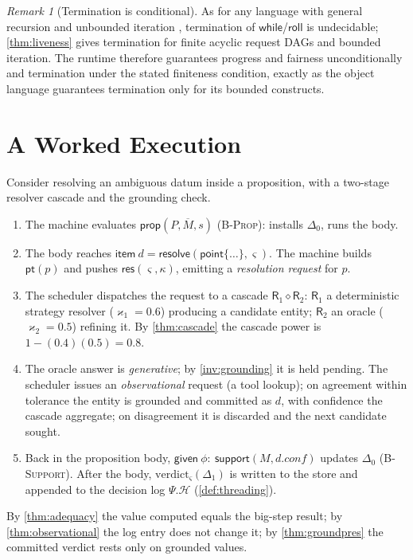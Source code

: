 \documentclass[11pt,a4paper]{article}
\theoremstyle{plain}
\theoremstyle{definition}
\theoremstyle{remark}
\newtheorem{remark}[theorem]{Remark}
\newcommand{\cont}{\kappa}
\newcommand{\dbt}{\Delta}
\newcommand{\sys}{\Psi}
\newcommand{\catp}{\varkappa}              %
\newcommand{\Res}{\mathsf{R}}              %
\newcommand{\rn}[1]{\textsc{#1}}
\begin{document}
\begin{remark}[Termination is conditional]
As for any language with general recursion and unbounded iteration
\citep{hopcroft2006}, termination of $\mathsf{while}$/$\mathsf{roll}$ is
undecidable; \cref{thm:liveness} gives termination for finite acyclic request
DAGs and bounded iteration. The runtime therefore guarantees progress and
fairness unconditionally and termination under the stated finiteness condition,
exactly as the object language guarantees termination only for its bounded
constructs.
\end{remark}

\section{A Worked Execution}
\label{sec:trace}

Consider resolving an ambiguous datum inside a proposition, with a two-stage
resolver cascade and the grounding check.

\begin{enumerate}[leftmargin=1.5em]
\item The machine evaluates $\mathsf{prop}(P,\overline M,s)$ (\rn{B-Prop}):
installs $\dbt_0$, runs the body.
\item The body reaches $\mathsf{item}\ d=\mathsf{resolve}(\mathsf{point}\{
\dots\},\varsigma)$. The machine builds $\mathsf{pt}(p)$ and pushes
$\mathsf{res}(\varsigma,\cont)$, emitting a \emph{resolution request} for $p$.
\item The scheduler dispatches the request to a cascade $\Res_1\diamond\Res_2$:
$\Res_1$ a deterministic strategy resolver ($\catp_1=0.6$) producing a candidate
entity; $\Res_2$ an oracle ($\catp_2=0.5$) refining it. By \cref{thm:cascade}
the cascade power is $1-(0.4)(0.5)=0.8$.
\item The oracle answer is \emph{generative}; by \cref{inv:grounding} it is held
pending. The scheduler issues an \emph{observational} request (a tool lookup);
on agreement within tolerance the entity is grounded and committed as $d$, with
confidence the cascade aggregate; on disagreement it is discarded and the next
candidate sought.
\item Back in the proposition body, $\mathsf{given}\ \phi:\ \mathsf{support}(M,
d.\mathit{conf})$ updates $\dbt_0$ (\rn{B-Support}). After the body,
$\mathrm{verdict}_\varsigma(\dbt_1)$ is written to the store and appended to the
decision log $\sys.\mathcal H$ (\cref{def:threading}).
\end{enumerate}
By \cref{thm:adequacy} the value computed equals the big-step result; by
\cref{thm:observational} the log entry does not change it; by
\cref{thm:groundpres} the committed verdict rests only on grounded values.
\end{document}
